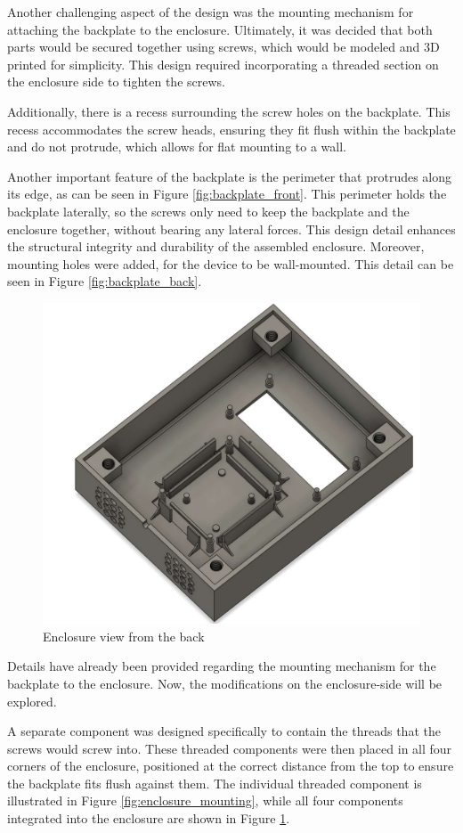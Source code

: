 Another challenging aspect of the design was the mounting mechanism for attaching the backplate to 
the enclosure. Ultimately, it was decided that both parts would be secured together using screws, 
which would be modeled and 3D printed for simplicity. This design required incorporating a 
threaded section on the enclosure side to tighten the screws.

Additionally, there is a recess surrounding the screw holes on the backplate. This recess 
accommodates the screw heads, ensuring they fit flush within the backplate and do not protrude, 
which allows for flat mounting to a wall.

Another important feature of the backplate is the perimeter that protrudes along its edge, as can 
be seen in Figure \ref{fig:backplate_front}. This perimeter holds the backplate laterally, so the 
screws only need to keep the backplate and the enclosure together, without bearing any lateral 
forces. This design detail enhances the structural integrity and durability of the assembled 
enclosure. Moreover, mounting holes were added, for the device to be wall-mounted. This detail can 
be seen in Figure \ref{fig:backplate_back}.

\begin{figure}[h]
	\centering
	\includegraphics[width = .5\textwidth]{Imagenes/Vectorial/enclosure_back.pdf}
	\caption{Enclosure view from the back}
	\label{fig:enclosure_back}
\end{figure}

Details have already been provided regarding the mounting mechanism for the backplate to the enclosure. Now, the modifications on the enclosure-side will be explored.

A separate component was designed specifically to contain the threads that the screws 
would screw into. These threaded components were then placed in all four corners of the enclosure, 
positioned at the correct distance from the top to ensure the backplate fits flush against them. 
The individual threaded component is illustrated in Figure \ref{fig:enclosure_mounting}, while all 
four components integrated into the enclosure are shown in Figure \ref{fig:enclosure_back}.


